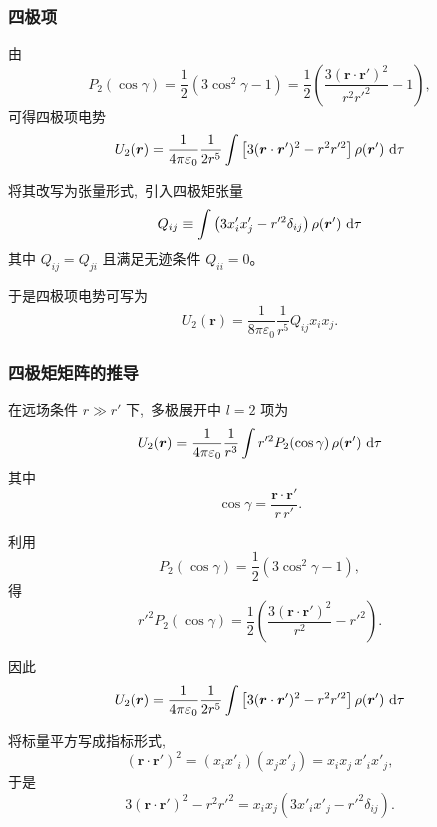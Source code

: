 \subsubsection{四极项}

由
\[
P_2(\cos\gamma)
=
\frac{1}{2}
\left(
3\cos^2\gamma-1
\right)
=
\frac{1}{2}
\left(
\frac{3(\boldsymbol r\cdot\boldsymbol r')^2}{r^2 r'^2}
-1
\right),
\]
可得四极项电势
\begin{equation}
U_2(\boldsymbol r)
=
\frac{1}{4\pi\varepsilon_0}
\frac{1}{2r^5}
\int
\left[
3(\boldsymbol r\cdot\boldsymbol r')^2
-
r^2 r'^2
\right]
\rho(\boldsymbol r')
\,\dif\tau
\end{equation}

将其改写为张量形式, \,引入四极矩张量
\begin{equation}
Q_{ij}
\equiv
\int
\left(
3x'_i x'_j
-
r'^2\delta_{ij}
\right)
\rho(\boldsymbol r')
\,\dif\tau
\end{equation}
其中 $Q_{ij}=Q_{ji}$ 且满足无迹条件 $Q_{ii}=0$。

于是四极项电势可写为
\begin{equation}
U_2(\boldsymbol r)
=
\frac{1}{8\pi\varepsilon_0}
\frac{1}{r^5}
Q_{ij} x_i x_j.
\end{equation}

\subsubsection{四极矩矩阵的推导}

在远场条件 $r\gg r'$ 下, \,多极展开中 $l=2$ 项为
\begin{equation}
U_2(\boldsymbol r)
=
\frac{1}{4\pi\varepsilon_0}
\frac{1}{r^{3}}
\int
r'^2 P_2(\cos\gamma)\,
\rho(\boldsymbol r')\,
\dif\tau
\end{equation}
其中
\[
\cos\gamma
=
\frac{\boldsymbol r\cdot\boldsymbol r'}{r\,r'}.
\]

利用
\[
P_2(\cos\gamma)
=
\frac{1}{2}\left(3\cos^2\gamma-1\right),
\]
得
\[
r'^2 P_2(\cos\gamma)
=
\frac{1}{2}
\left(
\frac{3(\boldsymbol r\cdot\boldsymbol r')^2}{r^2}
-
r'^2
\right).
\]

因此
\begin{equation}
U_2(\boldsymbol r)
=
\frac{1}{4\pi\varepsilon_0}
\frac{1}{2r^{5}}
\int
\left[
3(\boldsymbol r\cdot\boldsymbol r')^2
-
r^2 r'^2
\right]
\rho(\boldsymbol r')
\,\dif\tau
\end{equation}

将标量平方写成指标形式, \,
\[
(\boldsymbol r\cdot\boldsymbol r')^2
=
(x_i x'_i)(x_j x'_j)
=
x_i x_j\,x'_i x'_j,
\]
于是
\[
3(\boldsymbol r\cdot\boldsymbol r')^2
-
r^2 r'^2
=
x_i x_j
\left(
3x'_i x'_j
-
r'^2\delta_{ij}
\right).
\]

